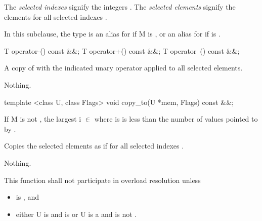 \pnum The \emph{selected indexes} signify the integers .
The \emph{selected elements} signify the elements  for all selected indexes .

\pnum In this subclause, the type  is an alias for  if \type M is \bool, or an alias for  if  is \true.

\pnum{}

\begin{itemdecl}
T operator-() const &&;
T operator+() const &&;
T operator~() const &&;
\end{itemdecl}
\begin{itemdescr}
  \pnum\returns A copy of  with the indicated unary operator applied to all selected elements.

  \pnum\throws Nothing.
\end{itemdescr}

\begin{itemdecl}
template <class U, class Flags> void copy_to(U *mem, Flags) const &&;
\end{itemdecl}
\begin{itemdescr}
   If \type M is not \bool, the largest i $\in$ \code{[0, M::size())} where  is \true is less than the number of values pointed to by .

  \pnum\effects Copies the selected elements as if  for all selected indexes .

  \pnum\throws Nothing.

  \pnum\remarks This function shall not participate in overload resolution unless
  \begin{itemize}
      \item {} is \true, and
      \item either \type U is \bool and  is \bool or
          \type U is a \realArithmeticType and  is not \bool.
  \end{itemize}
\end{itemdescr}


